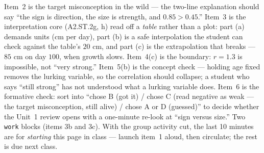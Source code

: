 \documentclass[10pt]{article}
\begin{document}
\begin{teachernote}[Homework]
Item~2 is the target misconception in the wild --- the two-line explanation should say ``the sign
is direction, the size is strength, and $0.85>0.45$.'' Item~3 is the interpretation core
(A2.ST.2g, h) read off a \emph{table} rather than a plot: part (a) demands units (cm per day),
part (b) is a safe interpolation the student can check against the table's $20$ cm, and part (c)
is the extrapolation that breaks --- $85$ cm on day $100$, when growth slows. Item~4(c) is the
boundary: $r=1.3$ is impossible, not ``very strong.'' Item~5(b) is the concept check --- holding
age fixed removes the lurking variable, so the correlation should collapse; a student who says
``still strong'' has not understood what a lurking variable does. Item~6 is the formative check:
sort into ``chose B (got it) / chose C (read negative as weak --- the target misconception, still
alive) / chose A or D (guessed)'' to decide whether the Unit~1 review opens with a one-minute
re-look at ``sign versus size.'' Two \texttt{work} blocks (items 3b and 3c). With the group
activity cut, the last 10 minutes are for \emph{starting} this page in class --- launch item~1
aloud, then circulate; the rest is due next class.
\end{teachernote}
\end{document}
